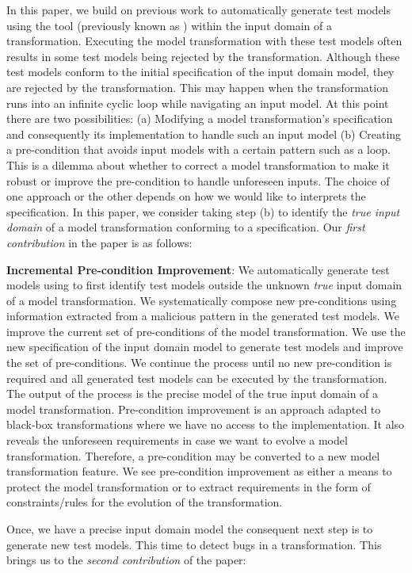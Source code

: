 In this paper, we build on previous work \cite{sen2008} to automatically generate test models using the tool {\Pramana} (previously known as {\Cartier}) within the input domain of a transformation. Executing the model transformation with these test models often results in some test models being rejected by the transformation. Although these test models conform to the initial specification of the input domain model, they are rejected by the transformation. This may happen when the transformation runs into an infinite cyclic loop while navigating an input model. At this point there are two possibilities: (a) Modifying a model transformation's specification and consequently its implementation to handle such an input model (b) Creating a pre-condition that avoids input models with a certain pattern such as a loop. This is a dilemma about whether to correct a model transformation to make it robust or improve the pre-condition to handle unforeseen inputs. The choice of one approach or the other depends on how we would like to interprets the specification. In this paper, we consider taking step (b) to identify the \emph{true input domain} of a model transformation conforming to a specification.  Our \emph{first contribution} in the paper is as follows:

\textbf{Incremental Pre-condition Improvement}: We automatically generate test models using {\Pramana} to first identify test models outside the unknown \emph{true} input domain of a model transformation. We  systematically compose new pre-conditions using information  extracted from a  malicious pattern in the generated test models. We improve the current set of pre-conditions of the model transformation. We use the new specification of the input domain model to generate test models and improve the set of pre-conditions. We continue the process until no new pre-condition is required and all generated test models can be executed by the transformation. The output of the process is the precise model of the true input domain of a model transformation. Pre-condition improvement is an approach adapted to black-box transformations where we have no access to the implementation. It also reveals the unforeseen requirements in case we want to evolve a model transformation. Therefore, a pre-condition may be converted to a new model transformation feature. We see pre-condition improvement as either a means to protect the model transformation or to extract requirements in the form of constraints/rules for the evolution of the transformation.

Once, we have a precise input domain model the consequent next step is to generate new test models. This time to detect bugs in a transformation. This brings us to the \emph{second contribution} of the paper:

